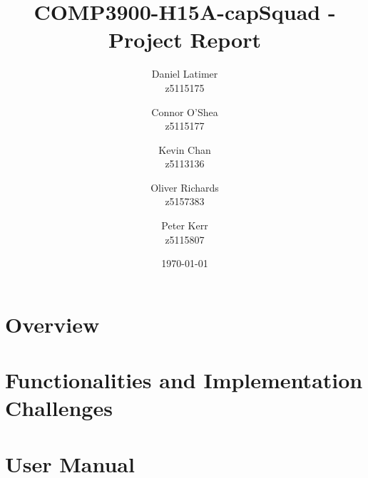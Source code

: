 \documentclass[12pt]{article}
\title{COMP3900-H15A-capSquad - Project Report}
\date{\today}
\author{
    Daniel Latimer \\ z5115175 \and
    Connor O'Shea \\ z5115177 \and
    Kevin Chan \\ z5113136 \and
    Oliver Richards \\ z5157383 \and
    Peter Kerr \\ z5115807}
\begin{document}
\maketitle
\tableofcontents

\newpage


\section{Overview}


\section{Functionalities and Implementation Challenges}



\section{User Manual}


\newpage



\end{document}
